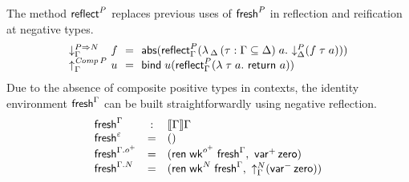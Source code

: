 \documentclass[sigconf,screen,fleqn]{acmart} %
\begin{document}
The method $\mathsf{reflect}_{}^{P}$ replaces previous uses of $\mathsf{fresh}^P$ in
reflection and reification at negative types.
\[
\begin{array}{l@{~}l@{~~}c@{~~}l}
  \downG {P \To N} & f & = & \tabs
    \left(
      \reflect[\Gamma] P
        \left(
          \lambda \, _\Delta \, (\tau : \Gamma \sublist \Delta) \; a .\
          \down[\Delta] P (f \; \tau \; a)
        \right)
    \right)
  \\
  \upG {\Comp P} & u & = & \tbind \; u
    \left(
      \reflect[\Gamma] P
        \left(
          \lambda \; \tau \; a .\
          \treturn\; a
        \right)
    \right)
\end{array}
\]
Due to the absence of composite positive types in contexts,
the identity environment
$\mathsf{fresh}^{\Gamma}$
can be built
straightforwardly using negative reflection.
\[
\begin{array}{lcl}
  \mathsf{fresh}^{\Gamma} & : & \mathopen{{[\kern-0.14em[}} \Gamma \mathclose{{]\kern-0.14em]}} \Gamma \\
  \mathsf{fresh}^{\varepsilon} & = & () \\
  \mathsf{fresh}^{\Gamma.o^+} & = &
    (
      \mathsf{ren}\;\mathsf{wk}^{o^+}\;\mathsf{fresh}^{\Gamma}
      , \
      \mathsf{var}^{+}\,\mathsf{zero}
    ) \\
  \mathsf{fresh}^{\Gamma.N} & = &
    (
      \mathsf{ren}\;\mathsf{wk}^N\;\mathsf{fresh}^{\Gamma}
      , \
      \mathord{\uparrow_{\Gamma}^{N}} (\mathsf{var}^{-}\,\mathsf{zero})
    ) \\
\end{array}
\]
\end{document}

